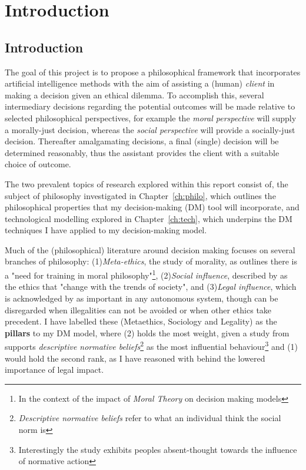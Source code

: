 \chapter{Introduction} \label{ch:intro}
\section{Introduction}\label{ch:intro.intro}
The goal of this project is to propose a philosophical framework that incorporates artificial intelligence methods with the aim of assisting a (human) \textit{client} in making a decision given an ethical dilemma. To accomplish this, several intermediary decisions regarding the potential outcomes will be made relative to selected philosophical perspectives, for example the \textit{moral perspective} will supply a morally-just decision, whereas the \textit{social perspective} will provide a socially-just decision. Thereafter amalgamating decisions, a final (single) decision will be determined reasonably, thus the assistant provides the client with a suitable choice of outcome. 

The two prevalent topics of research explored within this report consist of, the subject of philosophy investigated in Chapter~\ref{ch:philo}, which outlines the philosophical properties that my decision-making (DM) tool will incorporate, and technological modelling explored in Chapter~\ref{ch:tech}, which underpins the DM techniques I have applied to my decision-making model.

Much of the (philosophical) literature around decision making focuses on several branches of philosophy: (1)\textit{Meta-ethics}, the study of morality, as \cite{miner2003moral} outlines there is a "need for training in moral philosophy"\footnote{In the context of the impact of \textit{Moral Theory} on decision making models}, (2)\textit{Social influence}, described by \cite{baqer2012tech} as the ethics that "change with the trends of society", and (3)\textit{Legal influence}, which is acknowledged by \cite{dennis2013ethical} as important in any autonomous system, though can be disregarded when illegalities can not be avoided or when other ethics take precedent. I have labelled these (Metaethics, Sociology and Legality) as the \textbf{pillars} to my DM model, where (2) holds the most weight, given a study from \cite{nolan2008normative} supports\textit{ descriptive normative beliefs}\footnote{\textit{Descriptive normative beliefs} refer to what an individual think the social norm is} as the most influential behaviour\footnote{Interestingly the study exhibits peoples absent-thought towards the influence of normative action} and (1) would hold the second rank, as I have reasoned with \cite{dennis2013ethical} behind the lowered importance of legal impact.

